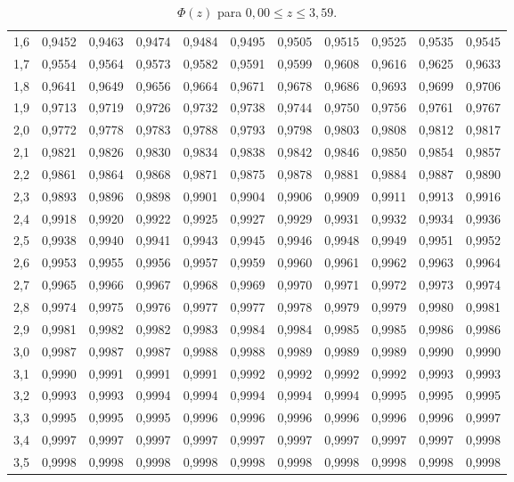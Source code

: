 \documentclass[../Notas.tex]{subfiles}
\begin{document}
\begin{table}[H]
\begin{tabular}{c|c|c|c|c|c|c|c|c|c|c}
        1,6 & 0,9452 & 0,9463 & 0,9474 & 0,9484 & 0,9495 & 0,9505 & 0,9515 & 0,9525 & 0,9535 & 0,9545 \\
        1,7 & 0,9554 & 0,9564 & 0,9573 & 0,9582 & 0,9591 & 0,9599 & 0,9608 & 0,9616 & 0,9625 & 0,9633 \\
        1,8 & 0,9641 & 0,9649 & 0,9656 & 0,9664 & 0,9671 & 0,9678 & 0,9686 & 0,9693 & 0,9699 & 0,9706 \\
        1,9 & 0,9713 & 0,9719 & 0,9726 & 0,9732 & 0,9738 & 0,9744 & 0,9750 & 0,9756 & 0,9761 & 0,9767 \\
        2,0 & 0,9772 & 0,9778 & 0,9783 & 0,9788 & 0,9793 & 0,9798 & 0,9803 & 0,9808 & 0,9812 & 0,9817 \\
        2,1 & 0,9821 & 0,9826 & 0,9830 & 0,9834 & 0,9838 & 0,9842 & 0,9846 & 0,9850 & 0,9854 & 0,9857 \\
        2,2 & 0,9861 & 0,9864 & 0,9868 & 0,9871 & 0,9875 & 0,9878 & 0,9881 & 0,9884 & 0,9887 & 0,9890 \\
        2,3 & 0,9893 & 0,9896 & 0,9898 & 0,9901 & 0,9904 & 0,9906 & 0,9909 & 0,9911 & 0,9913 & 0,9916 \\
        2,4 & 0,9918 & 0,9920 & 0,9922 & 0,9925 & 0,9927 & 0,9929 & 0,9931 & 0,9932 & 0,9934 & 0,9936 \\
        2,5 & 0,9938 & 0,9940 & 0,9941 & 0,9943 & 0,9945 & 0,9946 & 0,9948 & 0,9949 & 0,9951 & 0,9952 \\
        2,6 & 0,9953 & 0,9955 & 0,9956 & 0,9957 & 0,9959 & 0,9960 & 0,9961 & 0,9962 & 0,9963 & 0,9964 \\
        2,7 & 0,9965 & 0,9966 & 0,9967 & 0,9968 & 0,9969 & 0,9970 & 0,9971 & 0,9972 & 0,9973 & 0,9974 \\
        2,8 & 0,9974 & 0,9975 & 0,9976 & 0,9977 & 0,9977 & 0,9978 & 0,9979 & 0,9979 & 0,9980 & 0,9981 \\
        2,9 & 0,9981 & 0,9982 & 0,9982 & 0,9983 & 0,9984 & 0,9984 & 0,9985 & 0,9985 & 0,9986 & 0,9986 \\
        3,0 & 0,9987 & 0,9987 & 0,9987 & 0,9988 & 0,9988 & 0,9989 & 0,9989 & 0,9989 & 0,9990 & 0,9990 \\
        3,1 & 0,9990 & 0,9991 & 0,9991 & 0,9991 & 0,9992 & 0,9992 & 0,9992 & 0,9992 & 0,9993 & 0,9993 \\
        3,2 & 0,9993 & 0,9993 & 0,9994 & 0,9994 & 0,9994 & 0,9994 & 0,9994 & 0,9995 & 0,9995 & 0,9995 \\
        3,3 & 0,9995 & 0,9995 & 0,9995 & 0,9996 & 0,9996 &  0,9996 & 0,9996 & 0,9996 & 0,9996 & 0,9997 \\
        3,4 & 0,9997 & 0,9997 & 0,9997 & 0,9997 & 0,9997 & 0,9997 & 0,9997 & 0,9997 & 0,9997 & 0,9998 \\
        3,5 & 0,9998 & 0,9998 & 0,9998 & 0,9998 & 0,9998 &  0,9998 & 0,9998 & 0,9998 & 0,9998 & 0,9998
    \end{tabular}
    \caption{$\Phi(z)$ para $0,00 \leq z \leq 3,59$.}
\end{table}
\end{document}
